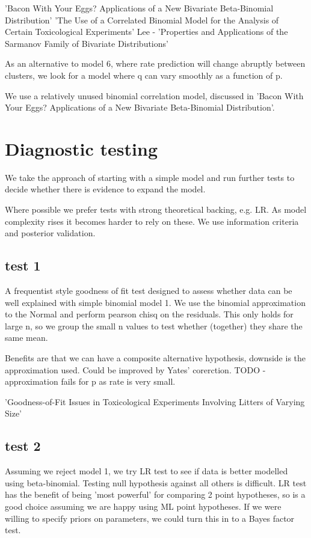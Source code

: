 \documentclass[12pt]{article}
\begin{document}
'Bacon With Your Eggs? Applications of a New Bivariate Beta-Binomial Distribution'
'The Use of a Correlated Binomial Model for the Analysis of Certain Toxicological Experiments'
Lee - 'Properties and Applications of the Sarmanov Family of Bivariate Distributions'

As an alternative to model 6, where rate prediction will change abruptly between clusters, we look for a model where q can vary smoothly as a function of p.

We use a relatively unused binomial correlation model, discussed in 'Bacon With Your Eggs? Applications of a New Bivariate Beta-Binomial Distribution'. 

\section{Diagnostic testing}

We take the approach of starting with a simple model and run further tests to decide whether there is evidence to expand the model. 

Where possible we prefer tests with strong theoretical backing, e.g. LR. As model complexity rises it becomes harder to rely on these. We use information criteria and posterior validation.

\subsection{test 1} A frequentist style goodness of fit test designed to assess whether data can be well explained with simple binomial model 1. We use the binomial approximation to the Normal and perform pearson chisq on the residuals. This only holds for large n, so we group the small n values to test whether (together) they share the same mean.

Benefits are that we can have a composite alternative hypothesis, downside is the approximation used. Could be improved by Yates' corerction. TODO - approximation fails for p as rate is very small.

'Goodness-of-Fit Issues in Toxicological Experiments Involving Litters of Varying Size'

\subsection{test 2}

Assuming we reject model 1, we try LR test to see if data is better modelled using beta-binomial. Testing null hypothesis against all others is difficult. LR test has the benefit of being 'most powerful' for comparing 2 point hypotheses, so is a good choice assuming we are happy using ML point hypotheses. If we were willing to specify priors on parameters, we could turn this in to a Bayes factor test.
\end{document}
